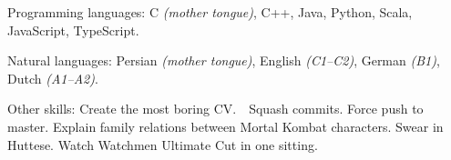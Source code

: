 \documentclass[10pt,a4paper]{article}
\begin{document}


\spacedhrule{0.5em}{-0.4em}


\inlineheadsection  %
  {Programming languages:}
  {C \emph{(mother tongue)}, C++, Java, Python, Scala, JavaScript, TypeScript.}

\vspace{0.5em}
\inlineheadsection
  {Natural languages:}
  {Persian \emph{(mother tongue)}, English \emph{(C1--C2)}, German \emph{(B1)}, Dutch \emph{(A1--A2)}. 
  }

\vspace{0.5em}
\inlineheadsection
  {Other skills:}
  {Create the most boring CV.~~Squash commits. Force push to master. Explain family relations between Mortal Kombat characters. Swear in Huttese. Watch Watchmen Ultimate Cut in one sitting.}
\end{document}
